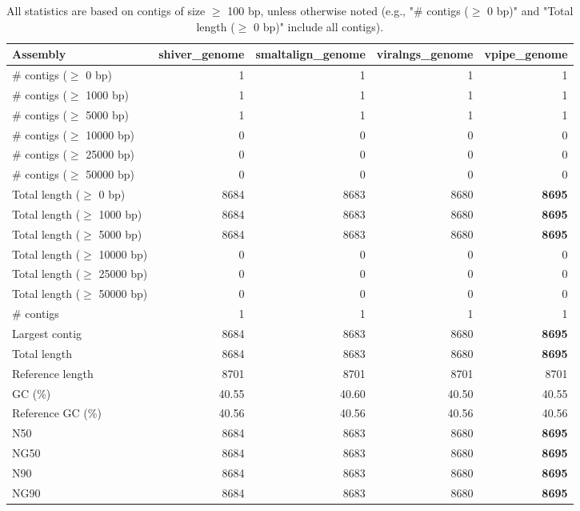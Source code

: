 \documentclass[12pt,a4paper]{article}
\begin{document}
\begin{table}[ht]
\begin{center}
\caption{All statistics are based on contigs of size $\geq$ 100 bp, unless otherwise noted (e.g., "\# contigs ($\geq$ 0 bp)" and "Total length ($\geq$ 0 bp)" include all contigs).}
\begin{tabular}{|l*{4}{|r}|}
\hline
Assembly & shiver\_genome & smaltalign\_genome & viralngs\_genome & vpipe\_genome \\ \hline
\# contigs ($\geq$ 0 bp) & 1 & 1 & 1 & 1 \\ \hline
\# contigs ($\geq$ 1000 bp) & 1 & 1 & 1 & 1 \\ \hline
\# contigs ($\geq$ 5000 bp) & 1 & 1 & 1 & 1 \\ \hline
\# contigs ($\geq$ 10000 bp) & 0 & 0 & 0 & 0 \\ \hline
\# contigs ($\geq$ 25000 bp) & 0 & 0 & 0 & 0 \\ \hline
\# contigs ($\geq$ 50000 bp) & 0 & 0 & 0 & 0 \\ \hline
Total length ($\geq$ 0 bp) & 8684 & 8683 & 8680 & {\bf 8695} \\ \hline
Total length ($\geq$ 1000 bp) & 8684 & 8683 & 8680 & {\bf 8695} \\ \hline
Total length ($\geq$ 5000 bp) & 8684 & 8683 & 8680 & {\bf 8695} \\ \hline
Total length ($\geq$ 10000 bp) & 0 & 0 & 0 & 0 \\ \hline
Total length ($\geq$ 25000 bp) & 0 & 0 & 0 & 0 \\ \hline
Total length ($\geq$ 50000 bp) & 0 & 0 & 0 & 0 \\ \hline
\# contigs & 1 & 1 & 1 & 1 \\ \hline
Largest contig & 8684 & 8683 & 8680 & {\bf 8695} \\ \hline
Total length & 8684 & 8683 & 8680 & {\bf 8695} \\ \hline
Reference length & 8701 & 8701 & 8701 & 8701 \\ \hline
GC (\%) & 40.55 & 40.60 & 40.50 & 40.55 \\ \hline
Reference GC (\%) & 40.56 & 40.56 & 40.56 & 40.56 \\ \hline
N50 & 8684 & 8683 & 8680 & {\bf 8695} \\ \hline
NG50 & 8684 & 8683 & 8680 & {\bf 8695} \\ \hline
N90 & 8684 & 8683 & 8680 & {\bf 8695} \\ \hline
NG90 & 8684 & 8683 & 8680 & {\bf 8695} \\ \hline

\end{tabular}
\end{center}
\end{table}
\end{document}
